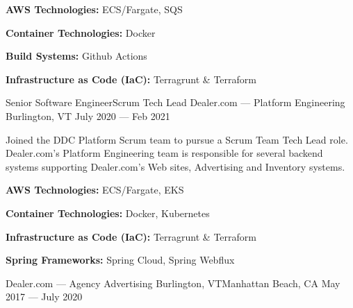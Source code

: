 \vspace{-2.00mm}
\begin{cventries}
    {} %
    {} %
    {} %
    {%
      \begin{cvitems} %
        \item {\textbf{AWS Technologies:} ECS/Fargate, SQS}
        \item {\textbf{Container Technologies:} Docker}
        \item {\textbf{Build Systems:} Github Actions}
        \item {\textbf{Infrastructure as Code (IaC):} Terragrunt \& Terraform}
      \end{cvitems}
    }

  \cventry
    {Senior Software Engineer{\enskip\cdotp\enskip}Scrum Tech Lead} %
    {Dealer.com --- Platform Engineering} %
    {Burlington, VT} %
    {July 2020 --- Feb 2021} %
    {}
\end{cventries}
\vspace{-6.00mm}

\begin{cvparagraph}
Joined the DDC Platform Scrum team to pursue a Scrum Team Tech Lead role. Dealer.com's Platform Engineering team is responsible for several backend systems supporting Dealer.com's Web sites, Advertising and Inventory systems.
\end{cvparagraph}

\vspace{-2.00mm}
\begin{cventries}
    {} %
    {} %
    {} %
    {%
      \begin{cvitems} %
        \item {\textbf{AWS Technologies:} ECS/Fargate, EKS}
        \item {\textbf{Container Technologies:} Docker, Kubernetes}
        \item {\textbf{Infrastructure as Code (IaC):} Terragrunt \& Terraform}
        \item {\textbf{Spring Frameworks:} Spring Cloud, Spring Webflux}
      \end{cvitems}
    }


    {Dealer.com --- Agency Advertising} %
    {Burlington, VT{\vspace{1mm}\newline}Manhattan Beach, CA} %
    {May 2017 --- July 2020} %
    {}
\end{cventries}
\vspace{-6.00mm}

